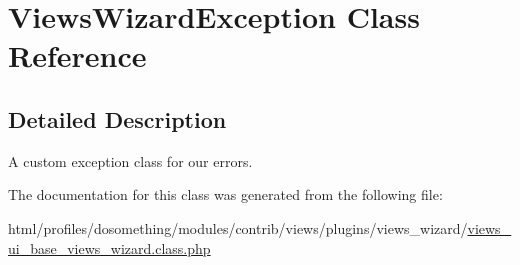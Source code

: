 \hypertarget{classViewsWizardException}{
\section{ViewsWizardException Class Reference}
\label{classViewsWizardException}
}


\subsection{Detailed Description}
A custom exception class for our errors. 

The documentation for this class was generated from the following file:\begin{DoxyCompactItemize}
\item 
html/profiles/dosomething/modules/contrib/views/plugins/views\_\-wizard/\hyperlink{views__ui__base__views__wizard_8class_8php}{views\_\-ui\_\-base\_\-views\_\-wizard.class.php}\end{DoxyCompactItemize}
